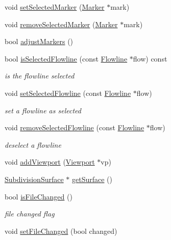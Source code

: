 \begin{DoxyCompactItemize}
void \hyperlink{classShipCAD_1_1ShipCADModel_afd7e984f4070d08cb16264c1b731580f}{set\-Selected\-Marker} (\hyperlink{classShipCAD_1_1Marker}{Marker} $\ast$mark)
\item 
void \hyperlink{classShipCAD_1_1ShipCADModel_a7fb06b0a1fa75ef02597752fc3f691a2}{remove\-Selected\-Marker} (\hyperlink{classShipCAD_1_1Marker}{Marker} $\ast$mark)
\item 
bool \hyperlink{classShipCAD_1_1ShipCADModel_a64493dfc69513b4d9425e3736e41b596}{adjust\-Markers} ()
\item 
bool \hyperlink{classShipCAD_1_1ShipCADModel_a9276e43cb3f7917782f91a7cf3faa215}{is\-Selected\-Flowline} (const \hyperlink{classShipCAD_1_1Flowline}{Flowline} $\ast$flow) const 
\begin{DoxyCompactList}\small\item\em is the flowline selected \end{DoxyCompactList}\item 
void \hyperlink{classShipCAD_1_1ShipCADModel_af61065a1e9050cff7cb91c8312082e2a}{set\-Selected\-Flowline} (const \hyperlink{classShipCAD_1_1Flowline}{Flowline} $\ast$flow)
\begin{DoxyCompactList}\small\item\em set a flowline as selected \end{DoxyCompactList}\item 
void \hyperlink{classShipCAD_1_1ShipCADModel_ad16bba5c648dec8cddfe23ed9b07615a}{remove\-Selected\-Flowline} (const \hyperlink{classShipCAD_1_1Flowline}{Flowline} $\ast$flow)
\begin{DoxyCompactList}\small\item\em deselect a flowline \end{DoxyCompactList}\item 
void \hyperlink{classShipCAD_1_1ShipCADModel_a6d868bbb71f72c46e6827adeed8afc4b}{add\-Viewport} (\hyperlink{classShipCAD_1_1Viewport}{Viewport} $\ast$vp)
\item 
\hyperlink{classShipCAD_1_1SubdivisionSurface}{Subdivision\-Surface} $\ast$ \hyperlink{classShipCAD_1_1ShipCADModel_a6941ad7a2b167419e844823fa8461019}{get\-Surface} ()
\item 
bool \hyperlink{classShipCAD_1_1ShipCADModel_a2cf41d2e7463763c81c7850fe953437e}{is\-File\-Changed} ()
\begin{DoxyCompactList}\small\item\em file changed flag \end{DoxyCompactList}\item 
void \hyperlink{classShipCAD_1_1ShipCADModel_a98ebcb64c5c759cbd0ae6e817b7168b2}{set\-File\-Changed} (bool changed)

\end{DoxyCompactItemize}
